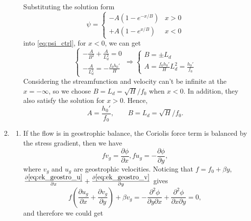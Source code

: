 \documentclass[a4paper]{article}
\begin{document}
\begin{enumerate}[label=\textbf{\arabic*.}]
\begin{enumerate}[label=\textbf{(\alph*)}]
		Substituting the solution form
		$$\psi = \left\{ 
		\begin{array} {ll}{ - A \left( 1- e^{-x/B} \right) } & {x > 0} \\
		 {+ A \left( 1- e^{x/B} \right)} & {x < 0}
		 \end{array}
		 \right.$$
		 into \eqref{eq:psi_ctrl}, for $x<0$, we can get 
		 $$ \left\{ 
		 \begin{array} {ll} -\frac{A}{B^2}+\frac{A}{L_d^2}=0\\
		 -\frac{A}{L_d^2}=-\frac{f_0h_0'}{H}
		 \end{array}
		 \right. \Longrightarrow  \left\{ 
		 \begin{array} {ll} B=\pm L_d\\
		 A = \frac{f_0h_0'}{H}L_d^2 = \frac{h_0'}{f_0}
		 \end{array}
		 \right. $$
		 Considering the streamfunction and velocity can't be infinite at the $x=-\infty$, so we choose $B=L_d=\sqrt{H}/f_0$ when $x<0$. In addition, they also satisfy the solution for $x>0$. Hence, $$A=\frac{h_0'}{f_0},\qquad B= L_d=\sqrt{H}/f_0.$$
		\end{enumerate}
	
	\vspace{1cm}
	\item 
	
		\begin{enumerate}[label=\textbf{(\alph*)}]
			\item
			If the flow is in geostrophic balance, the Coriolis force term is balanced by the stress gradient, then we have
			\begin{subequations}
				\begin{equation}\label{eq:ek_geostro_v}
					fv_g = \frac{\partial \phi} {\partial x}, 
				\end{equation}
				\begin{equation}\label{eq:ek_geostro_u}
					fu_g = -\frac{\partial \phi} {\partial y},
				\end{equation}
			\end{subequations}
			where $v_g$ and $u_g$ are geostrophic velocities.
			Noticing that $f=f_0+\beta y$, $\frac{\partial \eqref{eq:ek_geostro_u}}{\partial x} + \frac{\partial \eqref{eq:ek_geostro_v}}{\partial y}$ gives
			$$f \left( \frac { \partial u_{ g } } { \partial x } + \frac { \partial v_{ g } } { \partial y } \right)+\beta v_g = -\frac{\partial^2 \phi} {\partial y\partial x} +\frac{\partial^2 \phi} {\partial x \partial y}=0,$$
			and therefore we could get		
			

\end{enumerate}
\end{enumerate}
\end{document}
